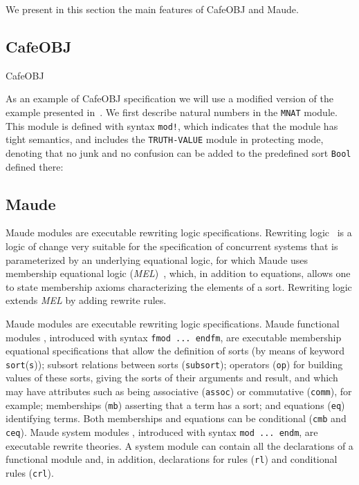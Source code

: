 
We present in this section the main features of CafeOBJ and Maude.

\subsection{CafeOBJ\label{subsec:cafe}}

CafeOBJ~\cite{cafe-report}

As an example of CafeOBJ specification we will use a modified version of the example presented
in~\cite{mfe11}. We first describe natural numbers in the
\texttt{MNAT} module. This module is defined with syntax \texttt{mod!}, which indicates that
the module has tight semantics, and includes the \texttt{TRUTH-VALUE} module in protecting
mode, denoting that no junk and no confusion can be added to the predefined sort \texttt{Bool}
defined there:

\subsection{Maude\label{subsec:maude}}

Maude modules are executable rewriting logic specifications.
Rewriting logic~\cite{Meseguer92-tcs} is a logic of change very suitable
for the specification of concurrent systems that is parameterized by an
underlying equational logic, for which Maude uses membership
equational logic (\emph{MEL})~\cite{BouhoulaJouannaudMeseguer00},
which, in addition to
equations, allows one to state membership axioms characterizing
the elements of a sort. Rewriting logic extends \emph{MEL} by adding rewrite rules.

Maude modules are executable
rewriting logic specifications.
%
Maude functional modules \cite[Chap.~4]{maude-book}, introduced
with syntax \texttt{fmod ...\ endfm}, are executable membership
equational specifications 
that allow the definition of
sorts (by means of keyword
\texttt{sort}(\texttt{s})); subsort relations between sorts
(\texttt{subsort}); operators (\texttt{op}) for building values of these
sorts, giving the sorts of their arguments and result, and which may have
attributes such as being associative (\texttt{assoc}) or commutative
(\texttt{comm}), for example; memberships (\texttt{mb}) asserting that a term
has a sort; and equations (\texttt{eq}) identifying terms.
Both memberships and equations can be conditional (\texttt{cmb} and \texttt{ceq}).
%
Maude system modules \cite[Chap.~6]{maude-book}, introduced with syntax \texttt{mod ...\ endm},
are executable rewrite theories. A system module can contain all the
declarations of a functional module and, in addition, declarations for rules (\texttt{rl})
and conditional rules (\texttt{crl}).


